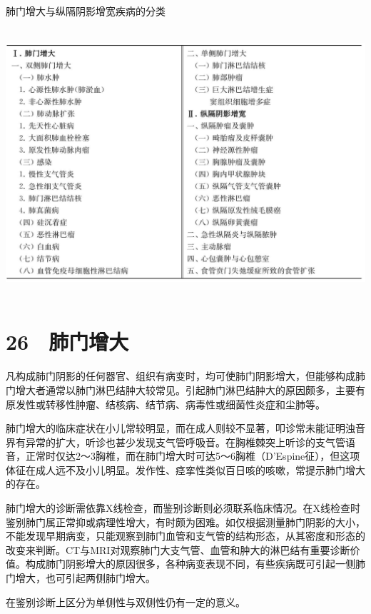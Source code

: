 \begin{table}[htbp]
\centering
\caption{肺门增大与纵隔阴影增宽疾病的分类}
\label{tab7-1}
\includegraphics[width=5.89583in,height=3.91667in]{./images/Image00052.jpg}
\end{table}

\protect\hypertarget{text00080.html}{}{}

\section{26　肺门增大}

凡构成肺门阴影的任何器官、组织有病变时，均可使肺门阴影增大，但能够构成肺门增大者通常以肺门淋巴结肿大较常见。引起肺门淋巴结肿大的原因颇多，主要有原发性或转移性肿瘤、结核病、结节病、病毒性或细菌性炎症和尘肺等。

肺门增大的临床症状在小儿常较明显，而在成人则较不显著，叩诊常未能证明浊音界有异常的扩大，听诊也甚少发现支气管呼吸音。在胸椎棘突上听诊的支气管语音，正常时仅达2～3胸椎，而在肺门增大时可达5～6胸椎（D'Espine征），但这项体征在成人远不及小儿明显。发作性、痉挛性类似百日咳的咳嗽，常提示肺门增大的存在。

肺门增大的诊断需依靠X线检查，而鉴别诊断则必须联系临床情况。在X线检查时鉴别肺门属正常抑或病理性增大，有时颇为困难。如仅根据测量肺门阴影的大小，不能发现早期病变，只能观察到肺门血管和支气管的结构形态，从其密度和形态的改变来判断。CT与MRI对观察肺门大支气管、血管和肿大的淋巴结有重要诊断价值。构成肺门阴影增大的原因很多，各种病变表现不同，有些疾病既可引起一侧肺门增大，也可引起两侧肺门增大。

在鉴别诊断上区分为单侧性与双侧性仍有一定的意义。

